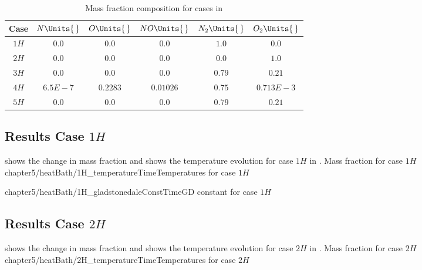     \begin{table}[H]
        \centering
        \begin{tabular}{|c|c|c|c|c|c|}
            \hline
           Case  & $N\Units{\,}$ & $O\Units{\,}$ & $NO\Units{\,}$ & $N_2\Units{\,}$ &
            $O_2\Units{\,}$ \\ \hline\hline
            $1H$ & $0.0$ & $0.0$ & $0.0$ & $1.0$ & $0.0$ \\ \hline
            $2H$ & $0.0$ & $0.0$ & $0.0$ & $0.0$ & $1.0$ \\ \hline
            $3H$ & $0.0$ & $0.0$ & $0.0$ & $0.79$ & $0.21$ \\ \hline
            $4H$ & $6.5E-7$ & $0.2283$ & $0.01026$ & $0.75$ & $0.713E-3$ \\ \hline
            $5H$ & $0.0$ & $0.0$ & $0.0$ & $0.79$ & $0.21$ \\ \hline
        \end{tabular}
        \caption{Mass fraction composition for cases in
        }
    \end{table}

    \subsection{Results Case $1H$ \label{sub:case1H}}
         shows the change in mass fraction and
     shows the temperature evolution for case $1H$
    in .
        {Mass fraction for case $1H$\label{fig:1HMassFractionNeutral}} 
        {chapter5/heatBath/1H_temperatureTime}{Temperatures for case $1H$\label{fig:1HTemperatures}}

    {chapter5/heatBath/1H_gladstonedaleConstTime}{\gls{GD}
    constant for case $1H$\label{fig:1HGladstoneDaleConst}}

        

    \subsection{Results Case $2H$ \label{sub:case2H}}
         shows the change in mass fraction and
     shows the temperature evolution for case $2H$
    in .
        {Mass fraction for case $2H$\label{fig:2HMassFractionNeutral}} 
        {chapter5/heatBath/2H_temperatureTime}{Temperatures for case $2H$\label{fig:2HTemperatures}}

